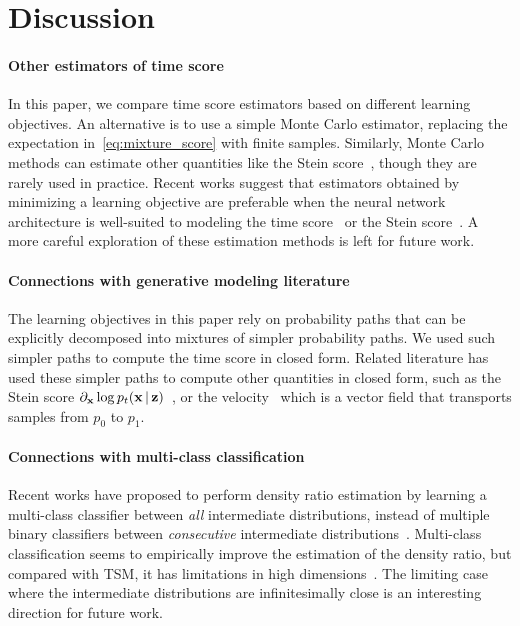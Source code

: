 

\section{Discussion}

\paragraph{Other estimators of time score}
In this paper, we compare time score estimators based on different learning objectives. An alternative is to use a simple Monte Carlo estimator, replacing the expectation in~\eqref{eq:mixture_score} with finite samples. Similarly, Monte Carlo methods can estimate other quantities like the Stein score~\citet{Scarvelis2024}, though they are rarely used in practice. Recent works suggest that estimators obtained by minimizing a learning objective are preferable when the neural network architecture is well-suited to modeling the time score~\citep{kamb2024analytic} or the Stein score~\citep{Kadkhodaie2024}. A more careful exploration of these estimation methods is left for future work.

\paragraph{Connections with generative modeling literature}
The learning objectives in this paper rely on probability paths that can be explicitly decomposed into mixtures of simpler probability paths. We used such simpler paths to compute the time score in closed form. Related literature has used these simpler paths to compute other quantities in closed form, such as the Stein score $\partial_{\operatorname{\mathbf{x}}} \log p_t(\operatorname{\mathbf{x}} | \operatorname{\mathbf{z}})$~\citep{song2021sde}, or the velocity~\citep{lipman2023conditionalflowmatching,liu2023,Albergo2023,pooladian2023conditionalflowmatching,tong2024conditionalflowmatching} which is a vector field that transports samples from $p_0$ to $p_1$. 

\paragraph{Connections with multi-class classification}
Recent works have proposed to perform density ratio estimation by learning a multi-class classifier between \textit{all} intermediate distributions, instead of multiple binary classifiers between \textit{consecutive} intermediate distributions~\citep{Srivastava2023,yair2023multiclass,yadin2024classification}. Multi-class classification seems to empirically improve the estimation of the density ratio, but compared with TSM, it has limitations in high dimensions~\citep{Srivastava2023}. The limiting case where the intermediate distributions are infinitesimally close is an interesting direction for future work.

